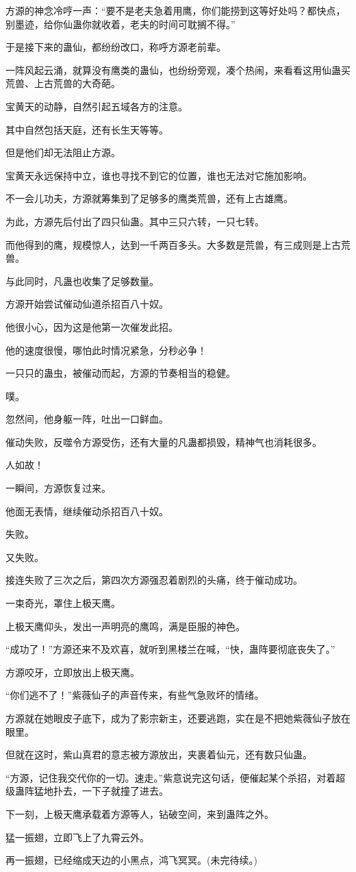 \begin{this_body}
方源的神念冷哼一声：“要不是老夫急着用鹰，你们能捞到这等好处吗？都快点，别墨迹，给你仙蛊你就收着，老夫的时间可耽搁不得。”

于是接下来的蛊仙，都纷纷改口，称呼方源老前辈。

一阵风起云涌，就算没有鹰类的蛊仙，也纷纷旁观，凑个热闹，来看看这用仙蛊买荒兽、上古荒兽的大奇葩。

宝黄天的动静，自然引起五域各方的注意。

其中自然包括天庭，还有长生天等等。

但是他们却无法阻止方源。

宝黄天永远保持中立，谁也寻找不到它的位置，谁也无法对它施加影响。

不一会儿功夫，方源就筹集到了足够多的鹰类荒兽，还有上古雄鹰。

为此，方源先后付出了四只仙蛊。其中三只六转，一只七转。

而他得到的鹰，规模惊人，达到一千两百多头。大多数是荒兽，有三成则是上古荒兽。

与此同时，凡蛊也收集了足够数量。

方源开始尝试催动仙道杀招百八十奴。

他很小心，因为这是他第一次催发此招。

他的速度很慢，哪怕此时情况紧急，分秒必争！

一只只的蛊虫，被催动而起，方源的节奏相当的稳健。

噗。

忽然间，他身躯一阵，吐出一口鲜血。

催动失败，反噬令方源受伤，还有大量的凡蛊都损毁，精神气也消耗很多。

人如故！

一瞬间，方源恢复过来。

他面无表情，继续催动杀招百八十奴。

失败。

又失败。

接连失败了三次之后，第四次方源强忍着剧烈的头痛，终于催动成功。

一束奇光，罩住上极天鹰。

上极天鹰仰头，发出一声明亮的鹰鸣，满是臣服的神色。

“成功了！”方源还来不及欢喜，就听到黑楼兰在喊，“快，蛊阵要彻底丧失了。”

方源咬牙，立即放出上极天鹰。

“你们逃不了！”紫薇仙子的声音传来，有些气急败坏的情绪。

方源就在她眼皮子底下，成为了影宗新主，还要逃跑，实在是不把她紫薇仙子放在眼里。

但就在这时，紫山真君的意志被方源放出，夹裹着仙元，还有数只仙蛊。

“方源，记住我交代你的一切。速走。”紫意说完这句话，便催起某个杀招，对着超级蛊阵猛地扑去，一下子就撞了进去。

下一刻，上极天鹰承载着方源等人，钻破空间，来到蛊阵之外。

猛一振翅，立即飞上了九霄云外。

再一振翅，已经缩成天边的小黑点，鸿飞冥冥。(未完待续。)

\end{this_body}

